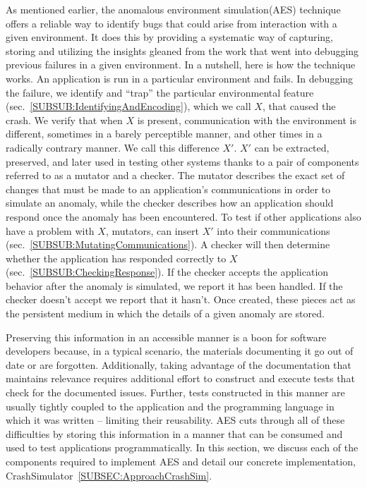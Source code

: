As mentioned earlier,
the anomalous environment simulation(AES) technique
offers a reliable way to identify bugs that could arise from interaction
with a given environment.
It does this by providing a systematic way of
capturing, storing and utilizing the insights gleaned from the work that
went into debugging previous failures in a given environment.
In a nutshell,
here is how the technique works.
An application is run
in a particular environment and fails.
In debugging the failure,
we identify and ``trap'' the particular environmental feature
(sec.~\ref{SUBSUB:IdentifyingAndEncoding}),
which we call $X$,
that caused the crash.
We verify that when $X$ is present,
communication with the
environment is different,
sometimes in a barely perceptible manner,
and other times in a radically contrary manner.
We call this difference $X'$.
$X'$ can be extracted, preserved,
and later used in testing other systems
thanks to a pair of components referred to as a mutator and a checker.
The mutator describes the exact set of changes
that must be made to an application's communications
in order to simulate an anomaly,
while the checker describes how an
application should respond once the anomaly has been encountered.
To test if other applications also have a problem with $X$, mutators,
can insert $X'$ into their
communications (sec.~\ref{SUBSUB:MutatingCommunications}).
A checker will then determine whether the
application has responded correctly to
$X$(sec.~\ref{SUBSUB:CheckingResponse}).
If the checker accepts the application behavior
after the anomaly is simulated,
we report it has been handled.
If the checker doesn't accept we report that it hasn't.
Once created,
these pieces act as the persistent medium in which the details of
a given anomaly are stored.

Preserving this information in an accessible manner
is a boon for software developers because,
in a typical scenario, the materials documenting it
go out of date or are forgotten.
Additionally,
taking advantage of the documentation that maintains relevance
requires additional effort
to construct and execute tests
that check for the documented issues.
Further, tests constructed in this manner are
usually tightly coupled
to the application and the programming language in which it was written --
limiting their reusability.
AES cuts through all of these difficulties by
storing this information in a manner that can be consumed
and used to test applications programmatically.
In this section, we discuss each of the components
required to implement AES
and detail our concrete implementation,
CrashSimulator~\ref{SUBSEC:ApproachCrashSim}.


